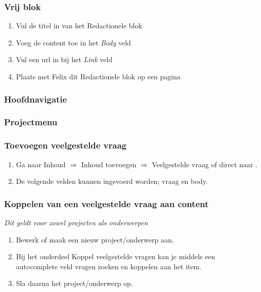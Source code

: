 \subsubsection{Vrij blok}
\begin{enumerate}
\item Vul de titel in van het Redactionele blok
\item Voeg de content toe in het \emph{Body} veld
\item Vul een url in bij het \emph{Link} veld
\item Plaats met Felix dit Redactionele blok op een pagina
\end{enumerate}

\subsubsection{Hoofdnavigatie}

\subsubsection{Projectmenu}

\subsubsection{Toevoegen veelgestelde vraag}

\begin{enumerate}
\item Ga naar Inhoud $\Rightarrow$ Inhoud toevoegen $\Rightarrow$ Veelgestelde vraag of direct naar .
\item De volgende velden kunnen ingevoerd worden; vraag en body.
\end{enumerate}

\subsubsection{Koppelen van een veelgestelde vraag aan content}

\emph{Dit geldt voor zowel projecten als onderwerpen}

\begin{enumerate}
\item Bewerk of maak een nieuw project/onderwerp aan.
\item Bij het onderdeel Koppel veelgestelde vragen kan je middels een autocomplete veld vragen zoeken en koppelen aan het item.
\item Sla daarna het project/onderwerp op.
\end{enumerate}

